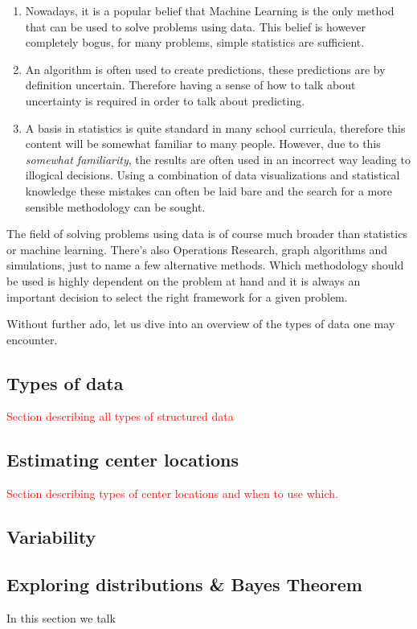 \documentclass[10pt]{extarticle}
\newcommand{\<}{\langle}
\renewcommand{\>}{\rangle}
\newcommand\todo[1]{\textcolor{red}{#1}}
\theoremstyle{mystyle}{\newtheorem*{remark}{Remark}}
\theoremstyle{mystyle}{\newtheorem*{remarks}{Remarks}}
\theoremstyle{mystyle}{\newtheorem*{example}{Example}}
\theoremstyle{mystyle}{\newtheorem*{examples}{Examples}}
\theoremstyle{definition}{\newtheorem*{exercise}{Exercise}}
\theoremstyle{warn}
\begin{document}
\begin{enumerate}
\item Nowadays, it is a popular belief that Machine Learning is the only method that can be used to solve problems using data. This belief is however completely bogus, for many problems, simple statistics are sufficient.
\item An algorithm is often used to create predictions, these predictions are by definition uncertain. Therefore having a sense of how to talk about uncertainty is required in order to talk about predicting.
\item A basis in statistics is quite standard in many school curricula, therefore this content will be somewhat familiar to many people. However, due to this \textit{somewhat familiarity}, the results are often used in an incorrect way leading to illogical decisions. Using a combination of data visualizations and statistical knowledge these mistakes can often be laid bare and the search for a more sensible methodology can be sought.
\end{enumerate}
\begin{remark}
The field of solving problems using data is of course much broader than statistics or machine learning. There's also Operations Research, graph algorithms and simulations, just to name a few alternative methods. Which methodology should be used is highly dependent on the problem at hand and it is always an important decision to select the right framework for a given problem.
\end{remark}
Without further ado, let us dive into an overview of the types of data one may encounter.
\subsection{Types of data}
\todo{Section describing all types of structured data}

\subsection{Estimating center locations}
\todo{Section describing types of center locations and when to use which.}

\subsection{Variability}

\subsection{Exploring distributions \& Bayes Theorem}
In this section we talk 
\end{document}
